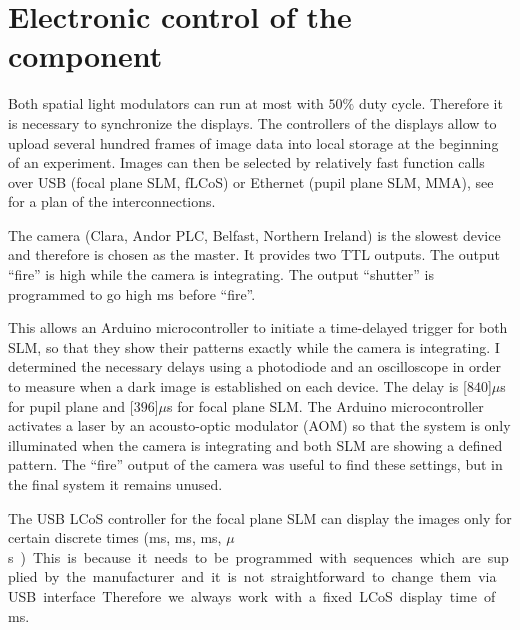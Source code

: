 \section{Electronic control of the component}
Both spatial light modulators can run at most with $50\%$ duty
 cycle. Therefore it is necessary to
synchronize the displays. The controllers of the displays allow to
upload several hundred frames of image data into local storage at the
beginning of an experiment. Images can then be selected by relatively
fast function calls over USB (focal plane SLM, fLCoS) or Ethernet
(pupil plane SLM, MMA), see  for a plan
of the interconnections.

The camera (Clara, Andor PLC, Belfast, Northern Ireland) is the
 slowest device and therefore is chosen as the
master. It provides two TTL outputs. The output ``fire'' is high while
the camera is integrating. The output ``shutter'' is programmed to go
high \unit[1]{ms} before ``fire''.

This allows an Arduino microcontroller to initiate a time-delayed
trigger for both SLM, so that they show their patterns exactly while
the camera is integrating. I determined the necessary delays using a
photodiode and an oscilloscope in order to measure when a dark image
is established on each device. The delay is \unit[$840$]{$\mu$s} for
pupil plane and \unit[$396$]{$\mu$s} for focal plane SLM. The Arduino
microcontroller activates a laser by an acousto-optic modulator (AOM)
so that the system is only illuminated when the camera is integrating
and both SLM are showing a defined pattern.  The ``fire'' output of
the camera was useful to find these settings, but in the final system
it remains unused.



The  USB LCoS controller for the
focal plane SLM can display the images only for certain discrete times
(\unit[20]{ms}, \unit[10]{ms}, \unit[5]{ms}, \unit[200]{$\mu$s}).
This is because it needs to be programmed with sequences which are
supplied by the manufacturer and it is not straightforward to change
them via USB interface. Therefore we always work with a fixed LCoS
display time of \unit[20]{ms}.

